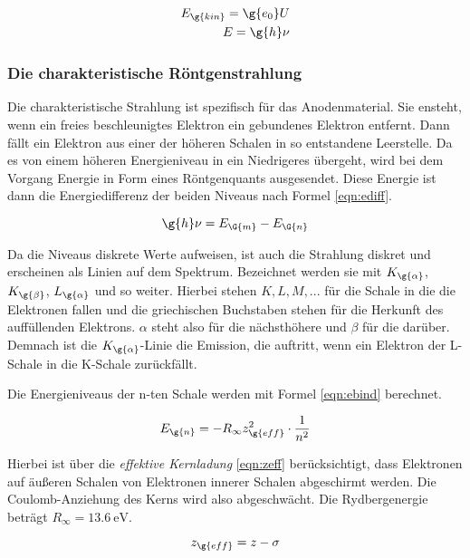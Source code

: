 \begin{align}
  E_{\g{kin}} = \g{e_0} U \label{eqn:Ekin}\\
  E = \g{h} \nu \label{eqn:Estrahl}
\end{align}

\subsubsection{Die charakteristische Röntgenstrahlung}

Die charakteristische Strahlung ist spezifisch für das Anodenmaterial. Sie ensteht,
wenn ein freies beschleunigtes Elektron ein gebundenes Elektron entfernt. Dann
fällt ein Elektron aus einer der höheren Schalen in so entstandene Leerstelle.
Da es von einem höheren Energieniveau in ein Niedrigeres übergeht, wird bei dem Vorgang Energie
in Form eines Röntgenquants ausgesendet. Diese Energie ist dann die Energiedifferenz der
beiden Niveaus nach Formel \eqref{eqn:ediff}.

\begin{equation}
  \g{h} \nu = E_{\G{m}}-E_{\G{n}}
  \label{eqn:ediff}
\end{equation}

Da die Niveaus diskrete Werte aufweisen, ist auch die Strahlung diskret und erscheinen
als Linien auf dem Spektrum. Bezeichnet werden sie mit $K_{\g{\alpha}}$, $K_{\g{\beta}}$,
$L_{\g{\alpha}}$ und so weiter.
Hierbei stehen $K, L, M, ...$ für die Schale in die die Elektronen fallen und
die griechischen Buchstaben stehen für die Herkunft des auffüllenden Elektrons.
$\alpha$ steht also für die nächsthöhere und $\beta$ für die darüber.
Demnach ist die $K_{\g{\alpha}}$-Linie die Emission, die auftritt, wenn ein Elektron
der L-Schale in die K-Schale zurückfällt.

Die Energieniveaus der n-ten Schale werden mit Formel \eqref{eqn:ebind} berechnet.

\begin{equation}
  E_{\g{n}} = -R_{\infty} z_{\g{eff}}^2 \cdot \frac{1}{n^2}
  \label{eqn:ebind}
\end{equation}

Hierbei ist über die \emph{effektive Kernladung} \eqref{eqn:zeff} berücksichtigt, dass
Elektronen auf äußeren Schalen von Elektronen innerer Schalen abgeschirmt werden.
Die Coulomb-Anziehung des Kerns wird also abgeschwächt. Die Rydbergenergie beträgt
$R_{\infty} = \SI{13.6}{\electronvolt}$.

\begin{equation}
  z_{\g{eff}} = z - \sigma
  \label{eqn:zeff}
\end{equation}

